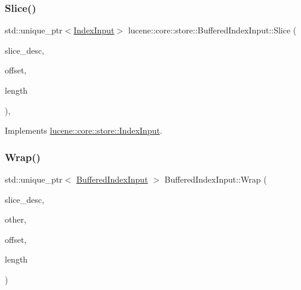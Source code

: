 \subsubsection{\texorpdfstring{Slice()}{Slice()}}
{\footnotesize\ttfamily std\+::unique\+\_\+ptr$<$\mbox{\hyperlink{classlucene_1_1core_1_1store_1_1IndexInput}{Index\+Input}}$>$ lucene\+::core\+::store\+::\+Buffered\+Index\+Input\+::\+Slice (\begin{DoxyParamCaption}\item[{\mbox{\hyperlink{ZlibCrc32_8h_a2c212835823e3c54a8ab6d95c652660e}{const}} std\+::string \&}]{slice\+\_\+desc,  }\item[{\mbox{\hyperlink{ZlibCrc32_8h_a2c212835823e3c54a8ab6d95c652660e}{const}} uint64\+\_\+t}]{offset,  }\item[{\mbox{\hyperlink{ZlibCrc32_8h_a2c212835823e3c54a8ab6d95c652660e}{const}} uint64\+\_\+t}]{length }\end{DoxyParamCaption})\hspace{0.3cm}{\ttfamily [inline]}, {\ttfamily [virtual]}}



Implements \mbox{\hyperlink{classlucene_1_1core_1_1store_1_1IndexInput_a3a2d71caf506c20d7c866bdcda5e0171}{lucene\+::core\+::store\+::\+Index\+Input}}.

\mbox{\label{classlucene_1_1core_1_1store_1_1BufferedIndexInput_a9e411949294cb06b40563e528f49b856}} 
\subsubsection{\texorpdfstring{Wrap()}{Wrap()}}
{\footnotesize\ttfamily std\+::unique\+\_\+ptr$<$ \mbox{\hyperlink{classlucene_1_1core_1_1store_1_1BufferedIndexInput}{Buffered\+Index\+Input}} $>$ Buffered\+Index\+Input\+::\+Wrap (\begin{DoxyParamCaption}\item[{\mbox{\hyperlink{ZlibCrc32_8h_a2c212835823e3c54a8ab6d95c652660e}{const}} std\+::string \&}]{slice\+\_\+desc,  }\item[{\mbox{\hyperlink{classlucene_1_1core_1_1store_1_1IndexInput}{Index\+Input}} $\ast$}]{other,  }\item[{\mbox{\hyperlink{ZlibCrc32_8h_a2c212835823e3c54a8ab6d95c652660e}{const}} uint64\+\_\+t}]{offset,  }\item[{\mbox{\hyperlink{ZlibCrc32_8h_a2c212835823e3c54a8ab6d95c652660e}{const}} uint64\+\_\+t}]{length }\end{DoxyParamCaption})\hspace{0.3cm}{\ttfamily [static]}}



